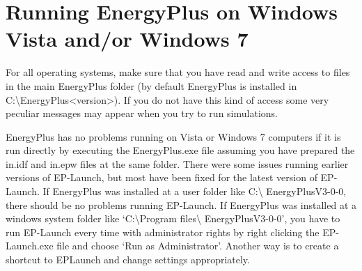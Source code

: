 \section{Running EnergyPlus on Windows Vista and/or Windows 7}\label{running-energyplus-on-windows-vista-andor-windows-7}

For all operating systems, make sure that you have read and write access to files in the main EnergyPlus folder (by default EnergyPlus is installed in C:\textbackslash{}EnergyPlus\textless{}version\textgreater{}). If you do not have this kind of access some very peculiar messages may appear when you try to run simulations.

EnergyPlus has no problems running on Vista or Windows 7 computers if it is run directly by executing the EnergyPlus.exe file assuming you have prepared the in.idf and in.epw files at the same folder. There were some issues running earlier versions of EP-Launch, but most have been fixed for the latest version of EP-Launch. If EnergyPlus was installed at a user folder like C:\textbackslash{} EnergyPlusV3-0-0, there should be no problems running EP-Launch. If EnergyPlus was installed at a windows system folder like `C:\textbackslash{}Program files\textbackslash{} EnergyPlusV3-0-0', you have to run EP-Launch every time with administrator rights by right clicking the EP-Launch.exe file and choose `Run as Administrator'. Another way is to create a shortcut to EPLaunch and change settings appropriately.
